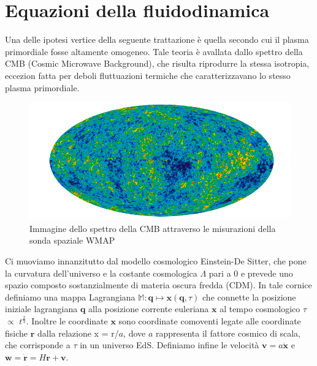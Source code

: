 \section{Equazioni della fluidodinamica}


Una delle ipotesi vertice della seguente trattazione è quella secondo cui il plasma primordiale fosse altamente omogeneo.
Tale teoria è avallata dallo spettro della CMB (Cosmic Microwave Background), che risulta riprodurre la stessa
isotropia, eccezion fatta per deboli fluttuazioni termiche che caratterizzavano lo stesso plasma primordiale.

\begin{center}
	\begin{figure}[H]
		\centering
		\includegraphics[scale=0.5, angle=0]{cmb.png}
		\caption{Immagine dello spettro della CMB attraverso le misurazioni della sonda spaziale WMAP}
		\label{fig:cmb}
	\end{figure}
\end{center}

Ci muoviamo innanzitutto dal modello cosmologico Einstein-De Sitter, che pone la curvatura dell'universo
e la costante cosmologica $\Lambda$ pari a 0 e prevede uno spazio composto sostanzialmente di materia
oscura fredda (CDM).
In tale cornice definiamo una mappa Lagrangiana $\mathbb{M}: \bm{q} \mapsto \bm{x}(\bm{q}, \tau)$ che connette la posizione
iniziale lagrangiana $\bm{q}$ alla posizione corrente euleriana $\bm{x}$ al tempo cosmologico $\tau$ $\propto$ $t^{\frac{2}{3}}$.
Inoltre le coordinate $\bm{x}$ sono coordinate comoventi legate alle coordinate fisiche $\bm{r}$ dalla relazione
x = r/$a$, dove $a$ rappresenta il fattore cosmico di scala, che corrisponde a $\tau$ in un universo
EdS.
Definiamo infine le velocità $\bm{v} = a \dot{\bm{x}}$ e $\bm{w} = \dot{\bm{r}} = H \bm{r} + \bm{v}$.

